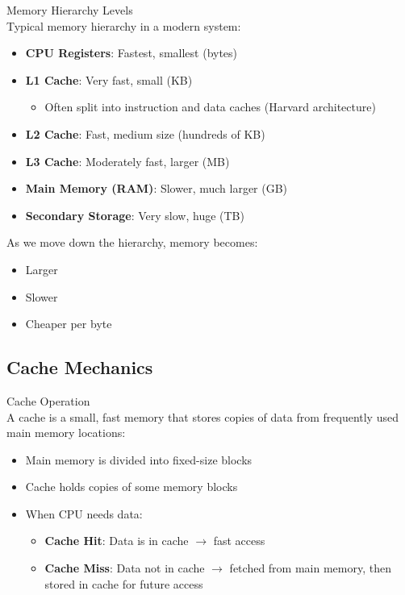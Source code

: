 \begin{definition}{Memory Hierarchy Levels}\\
Typical memory hierarchy in a modern system:
\begin{itemize}
    \item \textbf{CPU Registers}: Fastest, smallest (bytes)
    \item \textbf{L1 Cache}: Very fast, small (KB)
    \begin{itemize}
        \item Often split into instruction and data caches (Harvard architecture)
    \end{itemize}
    \item \textbf{L2 Cache}: Fast, medium size (hundreds of KB)
    \item \textbf{L3 Cache}: Moderately fast, larger (MB)
    \item \textbf{Main Memory (RAM)}: Slower, much larger (GB)
    \item \textbf{Secondary Storage}: Very slow, huge (TB)
\end{itemize}
As we move down the hierarchy, memory becomes:
\begin{itemize}
    \item Larger
    \item Slower
    \item Cheaper per byte
\end{itemize}
\end{definition}

\subsection{Cache Mechanics}

\begin{concept}{Cache Operation}\\
A cache is a small, fast memory that stores copies of data from frequently used main memory locations:
\begin{itemize}
    \item Main memory is divided into fixed-size blocks
    \item Cache holds copies of some memory blocks
    \item When CPU needs data:
    \begin{itemize}
        \item \textbf{Cache Hit}: Data is in cache $\rightarrow$ fast access
        \item \textbf{Cache Miss}: Data not in cache $\rightarrow$ fetched from main memory, then stored in cache for future access
    \end{itemize}
\end{itemize}
\end{concept}

